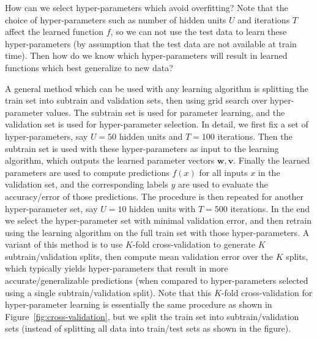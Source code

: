 \documentclass[12pt]{article}
\begin{document}
How can we select hyper-parameters which avoid overfitting? Note that
the choice of hyper-parameters such as number of hidden units $U$ and
iterations $T$ affect the learned function $f$, so we can not use the
test data to learn these hyper-parameters (by assumption that the test
data are not available at train time). Then how do we know which
hyper-parameters will result in learned functions which best
generalize to new data?

A general method which can be used with any learning algorithm is
splitting the train set into subtrain and validation sets, then using
grid search over hyper-parameter values. The subtrain set is used for
parameter learning, and the validation set is used for hyper-parameter
selection. In detail, we first fix a set of hyper-parameters, say
$U=50$ hidden units and $T=100$ iterations. Then the subtrain set is
used with these hyper-parameters as input to the learning algorithm,
which outputs the learned parameter vectors $\mathbf w, \mathbf
v$. Finally the learned parameters are used to compute predictions
$f(x)$ for all inputs $x$ in the validation set, and the corresponding
labels $y$ are used to evaluate the accuracy/error of those
predictions. The procedure is then repeated for another
hyper-parameter set, say $U=10$ hidden units with $T=500$
iterations. In the end we select the hyper-parameter set with minimal
validation error, and then retrain using the learning algorithm on the
full train set with those hyper-parameters. A variant of this method
is to use $K$-fold cross-validation to generate $K$
subtrain/validation splits, then compute mean validation error over
the $K$ splits, which typically yields hyper-parameters that result in
more accurate/generalizable predictions (when compared to
hyper-parameters selected using a single subtrain/validation
split). Note that this $K$-fold cross-validation for hyper-parameter
learning is essentially the same procedure as shown in
Figure~\ref{fig:cross-validation}, but we split the train set
into subtrain/validation sets (instead of splitting all data into
train/test sets as shown in the figure).
\end{document}

